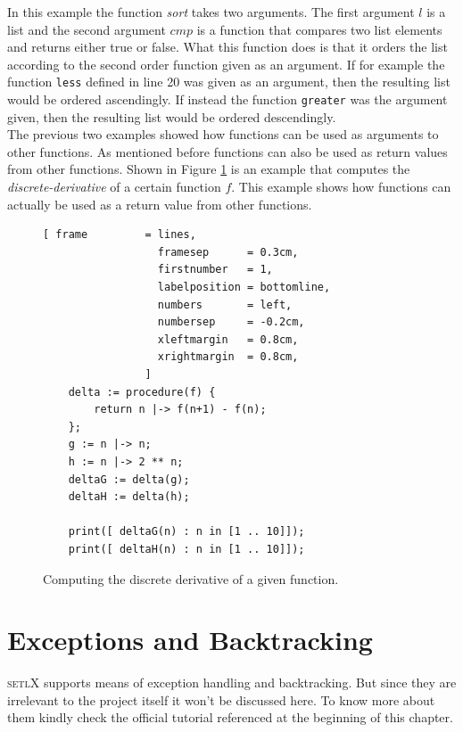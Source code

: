 \documentclass[11pt]{report}
\begin{document}
In this example the function \textsl{sort} takes two arguments. The first argument $l$ is a list and the second argument $cmp$ is a function that compares two list elements and returns either true or false. What this function does is that it orders the list according to the second order function given as an argument. If for example the function \texttt{less} defined in line 20 was given as an argument, then the resulting list would be ordered ascendingly. If instead the function \texttt{greater} was the argument given, then the resulting list would be ordered descendingly.
\\

The previous two examples showed how functions can be used as arguments to other functions. As mentioned before functions can also be used as return values from other functions. Shown in Figure \ref{fig:finite-difference.stlx} is an example that computes the \textsl{discrete-derivative} of a certain function $f$. This example shows how functions can actually be used as a return value from other functions.

\begin{figure}[!ht]
\centering
\begin{Verbatim}[ frame         = lines, 
                  framesep      = 0.3cm, 
                  firstnumber   = 1,
                  labelposition = bottomline,
                  numbers       = left,
                  numbersep     = -0.2cm,
                  xleftmargin   = 0.8cm,
                  xrightmargin  = 0.8cm,
                ]
    delta := procedure(f) {
        return n |-> f(n+1) - f(n);
    };    
    g := n |-> n;
    h := n |-> 2 ** n;
    deltaG := delta(g);
    deltaH := delta(h);
    
    print([ deltaG(n) : n in [1 .. 10]]);
    print([ deltaH(n) : n in [1 .. 10]]);
\end{Verbatim}
\vspace*{-0.3cm}
\caption{Computing the discrete derivative of a given function.}
\label{fig:finite-difference.stlx}
\end{figure}
\pagebreak

\section{Exceptions and Backtracking}

\textsc{setlX} supports means of exception handling and backtracking. But since they are irrelevant to the project itself it won't be discussed here. To know more about them kindly check the official tutorial referenced at the beginning of this chapter. 
\end{document}
